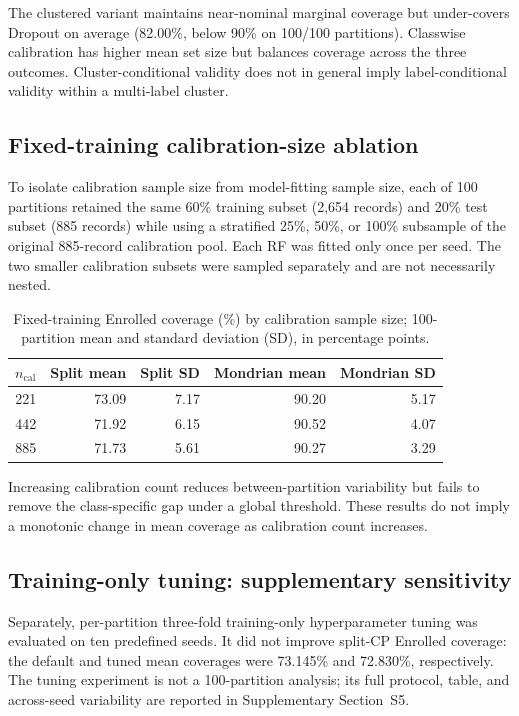 The clustered variant maintains near-nominal marginal coverage but
under-covers \textsf{Dropout} on average (82.00\%, below 90\% on 100/100
partitions). Classwise calibration has higher mean set size but balances
coverage across the three outcomes. Cluster-conditional validity does not in
general imply label-conditional validity within a multi-label cluster.

\subsection{Fixed-training calibration-size ablation}\label{sec:fixedcal}

To isolate calibration sample size from model-fitting sample size, each of
100 partitions retained the same 60\% training subset (2,654 records)
and 20\% test subset (885 records) while using a stratified 25\%, 50\%,
or 100\% subsample of the original 885-record calibration pool. Each RF
was fitted only once per seed. The two smaller calibration subsets were
sampled separately and are not necessarily nested.

\begin{table}[htbp]
\centering\small
\caption{Fixed-training \textsf{Enrolled} coverage (\%) by calibration sample
size; 100-partition mean and standard deviation (SD), in percentage points.}
\label{tab:fixedcal}
\begin{tabular}{rrrrr}
\toprule $n_{\mathrm{cal}}$ & Split mean & Split SD & Mondrian mean & Mondrian SD\\
\midrule
221 & 73.09 & 7.17 & 90.20 & 5.17\\
442 & 71.92 & 6.15 & 90.52 & 4.07\\
885 & 71.73 & 5.61 & 90.27 & 3.29\\
\bottomrule
\end{tabular}
\end{table}

Increasing calibration count reduces between-partition variability but
fails to remove the class-specific gap under a global threshold. These
results do not imply a monotonic change in mean coverage as calibration
count increases.

\subsection{Training-only tuning: supplementary sensitivity}

Separately, per-partition three-fold training-only hyperparameter tuning
was evaluated on ten predefined seeds. It did not improve split-CP
\textsf{Enrolled} coverage: the default and tuned mean coverages were
73.145\% and 72.830\%, respectively. The tuning experiment is not a
100-partition analysis; its full protocol, table, and across-seed
variability are reported in Supplementary Section~S5.

